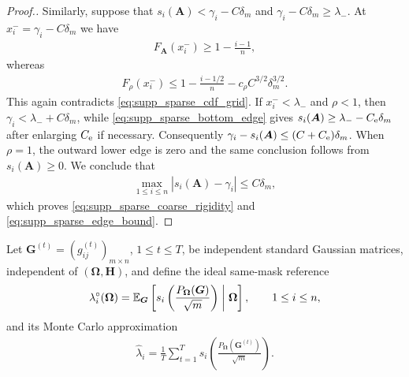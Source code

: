 \documentclass[numsec,webpdf,modern,large,namedate]{oup-authoring-template}
\theoremstyle{plain}
\theoremstyle{remark}
\newcommand{\bH}{\bm{H}}
\newcommand{\bOmega}{\bm{\Omega}}
\newif\ifmarkchanges
\newenvironment{revision}{\begingroup\ifmarkchanges\color{red}\fi}{\endgroup}
\begin{document}
\begin{revision}
\begin{proof}[Proof.]
Similarly, suppose that
$s_i(\bm A)<\gamma_i-C\delta_m$ and
$\gamma_i-C\delta_m\ge\lambda_-$.  At
$x_i^-=\gamma_i-C\delta_m$ we have
\begin{align*}
    F_{\bm A}(x_i^-)\ge1-\frac{i-1}{n},
\end{align*}
whereas
\begin{align*}
    F_\rho(x_i^-)
    \le1-\frac{i-1/2}{n}-c_\rho C^{3/2}\delta_m^{3/2}.
\end{align*}
This again contradicts \eqref{eq:supp_sparse_cdf_grid}.  If
$x_i^-<\lambda_-$ and $\rho<1$, then
$\gamma_i<\lambda_-+C\delta_m$, while
\eqref{eq:supp_sparse_bottom_edge} gives
$s_i(\bm A)\ge\lambda_--C_{\rm e}\delta_m$ after enlarging
$C_{\rm e}$ if necessary.  Consequently
$\gamma_i-s_i(\bm A)\le(C+C_{\rm e})\delta_m$.  When $\rho=1$, the
outward lower edge is zero and the same conclusion follows from
$s_i(\bm A)\ge0$.  We conclude that
\begin{align*}
    \max_{1\le i\le n}|s_i(\bm A)-\gamma_i|
    \le C\delta_m,
\end{align*}
which proves \eqref{eq:supp_sparse_coarse_rigidity} and
\eqref{eq:supp_sparse_edge_bound}.
\end{proof}

Let $\bm G^{(t)}=(g^{(t)}_{ij})_{m\times n}$, $1\le t\le T$, be independent
standard Gaussian matrices, independent of $(\bOmega,\bH)$, and define the
ideal same-mask reference
\begin{align}
\label{eq:supp_ideal_reference}
    \lambda_i^{\circ}(\bOmega)
    =\mathbb E_{\bm G}\left[
      s_i\left(\frac{P_{\bOmega}(\bm G)}{\sqrt m}\right)
      \biggm|\bOmega\right],
    \qquad1\le i\le n,
\end{align}
and its Monte Carlo approximation
\begin{align}
\label{eq:supp_mc_reference}
    \widehat\lambda_i
    =\frac1T\sum_{t=1}^T
      s_i\left(\frac{P_{\bOmega}(\bm G^{(t)})}{\sqrt m}\right).
\end{align}


\end{revision}
\end{document}
